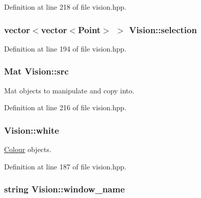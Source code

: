 Definition at line 218 of file vision.\+hpp.

\subsubsection[{\texorpdfstring{selection}{selection}}]{\setlength{\rightskip}{0pt plus 5cm}vector$<$vector$<$Point$>$ $>$ Vision\+::selection\hspace{0.3cm}{\ttfamily [private]}}\hypertarget{class_vision_ad6bcc0c75d2ec3d3af8863f797d47493}{}\label{class_vision_ad6bcc0c75d2ec3d3af8863f797d47493}


Definition at line 194 of file vision.\+hpp.

\subsubsection[{\texorpdfstring{src}{src}}]{\setlength{\rightskip}{0pt plus 5cm}Mat Vision\+::src\hspace{0.3cm}{\ttfamily [private]}}\hypertarget{class_vision_a20dae61ff0f80e5d4bfb9042a9e268a9}{}\label{class_vision_a20dae61ff0f80e5d4bfb9042a9e268a9}


Mat objects to manipulate and copy into. 



Definition at line 216 of file vision.\+hpp.

\subsubsection[{\texorpdfstring{white}{white}}]{ Vision\+::white\hspace{0.3cm}{\ttfamily [private]}}\hypertarget{class_vision_a3c6321608149b7d3967fa83d7548d6eb}{}\label{class_vision_a3c6321608149b7d3967fa83d7548d6eb}


\hyperlink{struct_colour}{Colour} objects. 



Definition at line 187 of file vision.\+hpp.

\subsubsection[{\texorpdfstring{window\+\_\+name}{window_name}}]{\setlength{\rightskip}{0pt plus 5cm}string Vision\+::window\+\_\+name\hspace{0.3cm}{\ttfamily [private]}}\hypertarget{class_vision_aefa7b216c7f6dac43438e0f9df163dae}{}\label{class_vision_aefa7b216c7f6dac43438e0f9df163dae}


